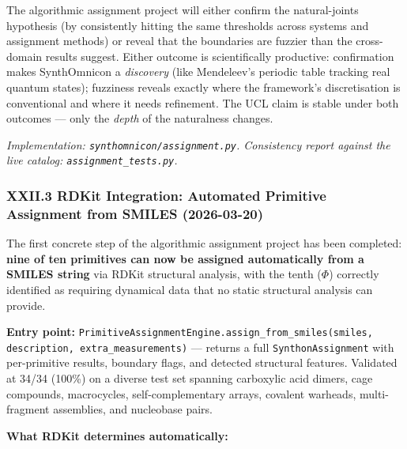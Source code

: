 \documentclass[12pt,a4paper]{article}
\begin{document}
The algorithmic assignment project will either confirm the natural-joints hypothesis (by consistently hitting the same thresholds across systems and assignment methods) or reveal that the boundaries are fuzzier than the cross-domain results suggest. Either outcome is scientifically productive: confirmation makes SynthOmnicon a \emph{discovery} (like Mendeleev's periodic table tracking real quantum states); fuzziness reveals exactly where the framework's discretisation is conventional and where it needs refinement. The UCL claim is stable under both outcomes --- only the \emph{depth} of the naturalness changes.

\emph{Implementation: \texttt{synthomnicon/assignment.py}. Consistency report against the live catalog: \texttt{assignment\_tests.py}.}

\subsubsection{XXII.3 RDKit Integration: Automated Primitive Assignment from SMILES (2026-03-20)}

The first concrete step of the algorithmic assignment project has been completed: \textbf{nine of ten primitives can now be assigned automatically from a SMILES string} via RDKit structural analysis, with the tenth ($\Phi$) correctly identified as requiring dynamical data that no static structural analysis can provide.

\textbf{Entry point:} \texttt{PrimitiveAssignmentEngine.assign\_from\_smiles(smiles, description, extra\_measurements)} --- returns a full \texttt{SynthonAssignment} with per-primitive results, boundary flags, and detected structural features. Validated at 34/34 (100\%) on a diverse test set spanning carboxylic acid dimers, cage compounds, macrocycles, self-complementary arrays, covalent warheads, multi-fragment assemblies, and nucleobase pairs.

\textbf{What RDKit determines automatically:}
\end{document}
